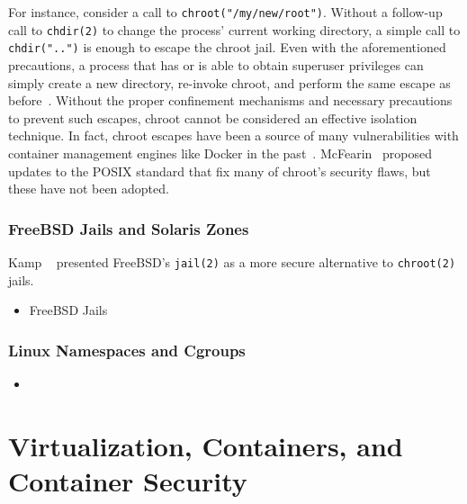 For instance, consider a call to \texttt{chroot("/my/new/root")}. Without a follow-up call
to \texttt{chdir(2)} to change the process' current working directory, a simple call to
\texttt{chdir("..")} is enough to escape the chroot jail. Even with the aforementioned
precautions, a process that has or is able to obtain superuser privileges can simply
create a new directory, re-invoke chroot, and perform the same escape as
before~\cite{mcfearin2011_chroot_jails}. Without the proper confinement mechanisms and
necessary precautions to prevent such escapes, chroot cannot be considered an effective
isolation technique. In fact, chroot escapes have been a source of many vulnerabilities
with container management engines like Docker in the past~\cite{combe2016_to_docker}.
McFearin~\cite{mcfearin2011_chroot_jails} proposed updates to the POSIX standard that fix
many of chroot's security flaws, but these have not been adopted.

\subsubsection*{FreeBSD Jails and Solaris Zones}

Kamp \etal~\cite{kamp2000_jails} presented FreeBSD's \texttt{jail(2)} as a more secure
alternative to \texttt{chroot(2)} jails.

\begin{inprogress}
  \begin{itemize}
    \item FreeBSD Jails~\cite{kamp2000_jails}
  \end{itemize}
\end{inprogress}

\subsubsection*{Linux Namespaces and Cgroups}

\begin{inprogress}
  \begin{itemize}
    \item
  \end{itemize}
\end{inprogress}






\section{Virtualization, Containers, and Container Security}%
\label{s:container-security-bg}

